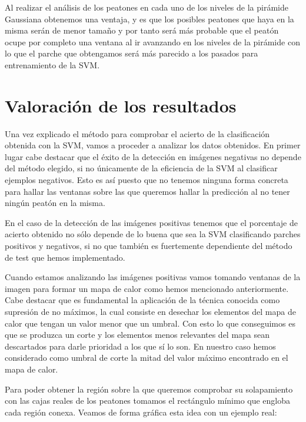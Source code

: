 \documentclass[a4paper,12pt]{article}
\begin{document}
Al realizar el análisis de los peatones en cada uno de los niveles de la pirámide Gaussiana obtenemos una ventaja, y es que los posibles peatones que haya en la misma serán de menor tamaño y por tanto será más probable que el peatón ocupe por completo una ventana al ir avanzando en los niveles de la pirámide con lo que el parche que obtengamos será más parecido a los pasados para entrenamiento de la SVM.



\section{Valoración de los resultados} 

Una vez explicado el método para comprobar el acierto de la clasificación obtenida con la SVM, vamos a proceder a analizar los datos obtenidos. En primer lugar cabe destacar que el éxito de la detección en imágenes negativas no depende del método elegido, si no únicamente de la eficiencia de la SVM al clasificar ejemplos negativos. Esto es así puesto que no tenemos ninguna forma concreta para hallar las ventanas sobre las que queremos hallar la predicción al no tener ningún peatón en la misma.

En el caso de la detección de las imágenes positivas tenemos que el porcentaje de acierto obtenido no sólo depende de lo buena que sea la SVM clasificando parches positivos y negativos, si no que también es fuertemente dependiente del método de test que hemos implementado.

Cuando estamos analizando las imágenes positivas vamos tomando ventanas de la imagen para formar un mapa de calor como hemos mencionado anteriormente. Cabe destacar que es fundamental la aplicación de la técnica conocida como supresión de no máximos, la cual consiste en desechar los elementos del mapa de calor que tengan un valor menor que un umbral. Con esto lo que conseguimos es que se produzca un corte y los elementos menos relevantes del mapa sean descartados para darle prioridad a los que sí lo son. En nuestro caso hemos considerado como umbral de corte la mitad del valor máximo encontrado en el mapa de calor. 

Para poder obtener la región sobre la que queremos comprobar su solapamiento con las cajas reales de los peatones tomamos el rectángulo mínimo que engloba cada región conexa. Veamos de forma gráfica esta idea con un ejemplo real:
\end{document}

